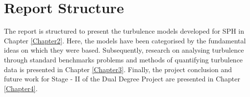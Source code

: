 \section{Report Structure}
The report is structured to present the turbulence models developed for SPH in Chapter \ref{Chapter2}. Here, the models have been categorised by the fundamental ideas on which they were based. Subsequently, research on analysing turbulence through standard benchmarks problems and methods of quantifying turbulence data is presented in Chapter \ref{Chapter3}.
Finally, the project conclusion and future work for Stage - II of the Dual Degree Project are presented in Chapter \ref{Chapter4}. 
